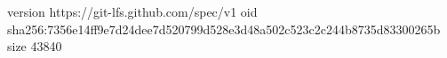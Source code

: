 version https://git-lfs.github.com/spec/v1
oid sha256:7356e14ff9e7d24dee7d520799d528e3d48a502c523c2c244b8735d83300265b
size 43840
